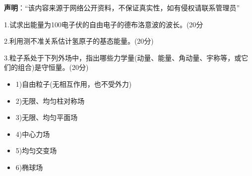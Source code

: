
\textbf{声明}：“该内容来源于网络公开资料，不保证真实性，如有侵权请联系管理员”

1.试求出能量为100电子伏的自由电子的德布洛意波的波长。(20分

2.利用测不准关系估计氢原子的基态能量。(20分)

3.粒子系处于下列外场中，指出哪些力学量(动量、能量、角动量、宇称等，或它们的组合)是守恒量。(20分)
\begin{itemize}
\item 1)自由粒子(无相互作用，也不受外力)
\item 2)无限、均匀柱对称场
\item 3)无限、均匀平面场
\item 4)中心力场
\item 5)均匀交变场
\item 6)椭球场
\end{itemize}